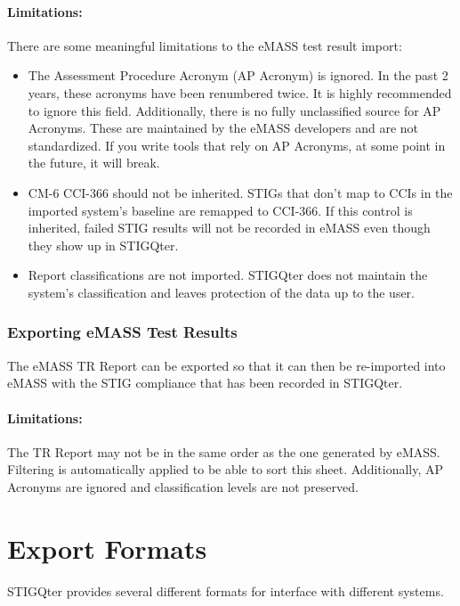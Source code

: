 \documentclass[letterpaper, 10pt, twoside]{article}
\begin{document}
\paragraph{Limitations:} There are some meaningful limitations to the eMASS test result import:
\begin{itemize}
	\item The Assessment Procedure Acronym (AP Acronym) is ignored. In the past 2 years, these acronyms have been renumbered twice. It is highly recommended to ignore this field. Additionally, there is no fully unclassified source for AP Acronyms. These are maintained by the eMASS developers and are not standardized. If you write tools that rely on AP Acronyms, at some point in the future, it will break.
	\item CM-6 CCI-366 should not be inherited. STIGs that don't map to CCIs in the imported system's baseline are remapped to CCI-366. If this control is inherited, failed STIG results will not be recorded in eMASS even though they show up in STIGQter.
	\item Report classifications are not imported. STIGQter does not maintain the system's classification and leaves protection of the data up to the user.
\end{itemize}

\subsubsection{Exporting eMASS Test Results}

The eMASS TR Report can be exported so that it can then be re-imported into eMASS with the STIG compliance that has been recorded in STIGQter.

\paragraph{Limitations:}

The TR Report may not be in the same order as the one generated by eMASS. Filtering is automatically applied to be able to sort this sheet. Additionally, AP Acronyms are ignored and classification levels are not preserved.

\section{Export Formats}

STIGQter provides several different formats for interface with different systems.
\end{document}
